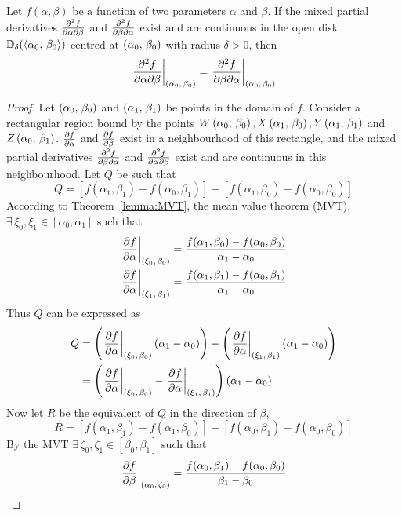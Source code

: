 \begin{theorem}\label{lemma:CLAIRAUT}
	Let $f(\alpha,\beta)$ be a function of two parameters $\alpha$ and $\beta$. If the mixed partial derivatives $\pdv{f}{\alpha}{\beta}$
	and $\pdv{f}{\beta}{\alpha}$ exist and are continuous in the open disk $\mathbb{D}_\delta(\langle\alpha_0,\,\beta_0\rangle)$ centred at
	$\left(\alpha_0,\,\beta_0\right)$ with radius $\delta>0$, then
	$$
		\eval{\pdv{f}{\alpha}{\beta}}_{\point{\alpha_0}{\beta_0}}=\eval{\pdv{f}{\beta}{\alpha}}_{\point{\alpha_0}{\beta_0}}
	$$
	\cite{GARRETT2015377}
	\begin{proof}
		Let $\left(\alpha_0,\,\beta_0\right)$ and $\left(\alpha_1,\,\beta_1\right)$ be points in the domain of $f$. Consider a rectangular region bound by the
		points $W\left(\alpha_0,\,\beta_0\right),X\left(\alpha_1,\,\beta_0\right), Y\left(\alpha_1,\,\beta_1\right)$ and $Z\left(\alpha_0,\,\beta_1\right)$. 
		$\pdv{f}{\alpha}$ and $\pdv{f}{\beta}$ exist in a neighbourhood of this rectangle, and the mixed partial derivatives 
		$\pdv{f}{\beta}{\alpha}$ and $\pdv{f}{\alpha}{\beta}$ exist and are continuous in this neighbourhood. Let $Q$ be such that
		$$
		Q=[f(\alpha_1,\beta_1)-f(\alpha_0,\beta_1)]-[f(\alpha_1,\beta_0)-f(\alpha_0,\beta_0)]
		$$
		According to Theorem~\ref{lemma:MVT}, the mean value theorem (MVT), $\exists\,\xi_0,\xi_1\in[\alpha_0,\alpha_1]$ such that
		\begin{align*}
			\eval{\pdv{f}{\alpha}}_{\point{\xi_0}{\beta_0}}&=\frac{f(\alpha_1,\beta_0)-f(\alpha_0,\beta_0)}{\alpha_1-\alpha_0}\\
			\eval{\pdv{f}{\alpha}}_{\point{\xi_1}{\beta_1}}&=\frac{f(\alpha_1,\beta_1)-f(\alpha_0,\beta_1)}{\alpha_1-\alpha_0}
		\end{align*}
		Thus $Q$ can be expressed as
		\begin{align*}
			Q&=\left(\eval{\pdv{f}{\alpha}}_{\point{\xi_0}{\beta_0}}\left(\alpha_1-\alpha_0\right)\right)-\left(\eval{\pdv{f}{\alpha}}_{\point{\xi_1}{\beta_1}}\left(\alpha_1-\alpha_0\right)\right)\\
			&=\left(\eval{\pdv{f}{\alpha}}_{\point{\xi_0}{\beta_0}}-\eval{\pdv{f}{\alpha}}_{\point{\xi_1}{\beta_1}}\right)\left(\alpha_1-\alpha_0\right)
		\end{align*}
		Now let $R$ be the equivalent of $Q$ in the direction of $\beta$,
		$$
			R=[f(\alpha_1,\beta_1)-f(\alpha_1,\beta_0)]-[f(\alpha_0,\beta_1)-f(\alpha_0,\beta_0)]
		$$
		By the MVT $\exists\,\zeta_0,\zeta_1\in[\beta_0,\beta_1]$ such that
		\begin{align*}
			\eval{\pdv{f}{\beta}}_{\point{\alpha_0}{\zeta_0}}&=\frac{f(\alpha_0,\beta_1)-f(\alpha_0,\beta_0)}{\beta_1-\beta_0}\\

\end{align*}
\end{proof}
\end{theorem}
